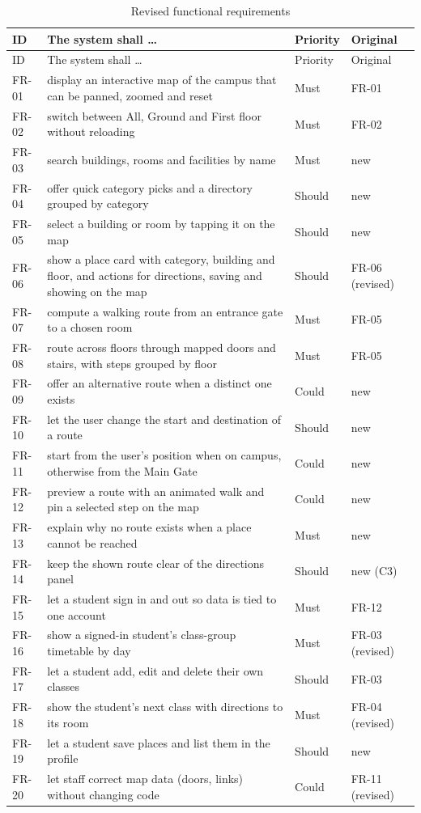 \documentclass[12pt,a4paper]{report}
\newcommand{\tablespacing}{\singlespacing\small}
\begin{document}
{\tablespacing
\begin{longtable}{p{1.3cm}p{8.6cm}p{1.4cm}p{2.2cm}}
\caption{Revised functional requirements}\label{tab:fr}\\
\toprule
ID & The system shall \ldots & Priority & Original \\
\midrule\endfirsthead
\toprule
ID & The system shall \ldots & Priority & Original \\
\midrule\endhead
\bottomrule\endfoot
FR-01 & display an interactive map of the campus that can be panned, zoomed and reset & Must & FR-01 \\
FR-02 & switch between All, Ground and First floor without reloading & Must & FR-02 \\
FR-03 & search buildings, rooms and facilities by name & Must & new \\
FR-04 & offer quick category picks and a directory grouped by category & Should & new \\
FR-05 & select a building or room by tapping it on the map & Should & new \\
FR-06 & show a place card with category, building and floor, and actions for directions, saving and showing on the map & Should & FR-06 (revised) \\
FR-07 & compute a walking route from an entrance gate to a chosen room & Must & FR-05 \\
FR-08 & route across floors through mapped doors and stairs, with steps grouped by floor & Must & FR-05 \\
FR-09 & offer an alternative route when a distinct one exists & Could & new \\
FR-10 & let the user change the start and destination of a route & Should & new \\
FR-11 & start from the user's position when on campus, otherwise from the Main Gate & Could & new \\
FR-12 & preview a route with an animated walk and pin a selected step on the map & Could & new \\
FR-13 & explain why no route exists when a place cannot be reached & Must & new \\
FR-14 & keep the shown route clear of the directions panel & Should & new (C3) \\
FR-15 & let a student sign in and out so data is tied to one account & Must & FR-12 \\
FR-16 & show a signed-in student's class-group timetable by day & Must & FR-03 (revised) \\
FR-17 & let a student add, edit and delete their own classes & Should & FR-03 \\
FR-18 & show the student's next class with directions to its room & Must & FR-04 (revised) \\
FR-19 & let a student save places and list them in the profile & Should & new \\
FR-20 & let staff correct map data (doors, links) without changing code & Could & FR-11 (revised) \\
\end{longtable}}
\end{document}
